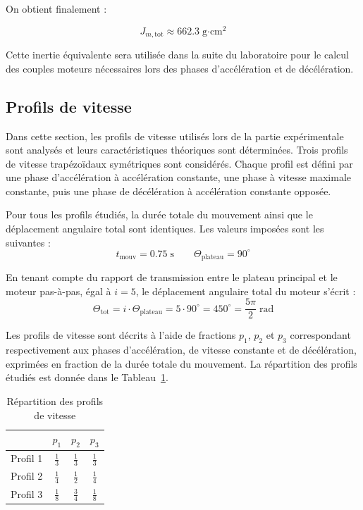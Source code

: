 On obtient finalement :

\begin{equation}
\boxed{
J_{m,\text{tot}} \approx 662.3 \; \text{g·cm}^2
}
\end{equation}

Cette inertie équivalente sera utilisée dans la suite du laboratoire pour le calcul des couples moteurs nécessaires lors des phases d’accélération et de décélération.
\subsection{Profils de vitesse}
Dans cette section, les profils de vitesse utilisés lors de la partie expérimentale sont analysés et leurs caractéristiques théoriques sont déterminées. Trois profils de vitesse trapézoïdaux symétriques sont considérés. Chaque profil est défini par une phase d’accélération à accélération constante, une phase à vitesse maximale constante, puis une phase de décélération à accélération constante opposée.  

Pour tous les profils étudiés, la durée totale du mouvement ainsi que le déplacement angulaire total sont identiques. Les valeurs imposées sont les suivantes :
\begin{equation}
t_{\text{mouv}} = 0.75 \; \text{s}
\qquad
\Theta_{\text{plateau}} = 90^\circ
\end{equation}

En tenant compte du rapport de transmission entre le plateau principal et le moteur pas-à-pas, égal à $i = 5$, le déplacement angulaire total du moteur s’écrit :
\begin{equation}
\Theta_{\text{tot}} = i \cdot \Theta_{\text{plateau}}
= 5 \cdot 90^\circ
= 450^\circ
= \frac{5\pi}{2} \; \text{rad}
\end{equation}

Les profils de vitesse sont décrits à l’aide de fractions $p_1$, $p_2$ et $p_3$ correspondant respectivement aux phases d’accélération, de vitesse constante et de décélération, exprimées en fraction de la durée totale du mouvement. La répartition des profils étudiés est donnée dans le Tableau~\ref{tab:profils}.

\begin{table}[h]
\centering
\renewcommand{\arraystretch}{1.5}
\begin{tabular}{|c|c|c|c|}
\hline
 & $p_1$ & $p_2$ & $p_3$ \\
\hline
Profil 1 & $\frac{1}{3}$ & $\frac{1}{3}$ & $\frac{1}{3}$ \\
\hline
Profil 2 & $\frac{1}{4}$ & $\frac{1}{2}$ & $\frac{1}{4}$ \\
\hline
Profil 3 & $\frac{1}{8}$ & $\frac{3}{4}$ & $\frac{1}{8}$ \\
\hline
\end{tabular}
\caption{Répartition des profils de vitesse}
\label{tab:profils}
\end{table}


